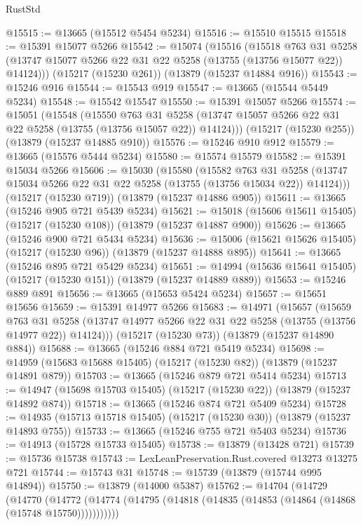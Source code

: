 \begin{lexlean}{RustStd}
\begin{coremodule}
@15515 := @13665 (@15512 @5454 @5234)
@15516 := @15510 @15515
@15518 := @15391 @15077 @5266
@15542 := @15074
    (@15516
      (@15518
        @763
        @31
        @5258
        (@13747 @15077 @5266 @22 @31 @22 @5258 (@13755 (@13756 @15077 @22)) @14124)))
    (@15217 (@15230 @261))
    (@13879 (@15237 @14884 @916))
@15543 := @15246 @916
@15544 := @15543 @919
@15547 := @13665 (@15544 @5449 @5234)
@15548 := @15542 @15547
@15550 := @15391 @15057 @5266
@15574 := @15051
    (@15548
      (@15550
        @763
        @31
        @5258
        (@13747 @15057 @5266 @22 @31 @22 @5258 (@13755 (@13756 @15057 @22)) @14124)))
    (@15217 (@15230 @255))
    (@13879 (@15237 @14885 @910))
@15576 := @15246 @910 @912
@15579 := @13665 (@15576 @5444 @5234)
@15580 := @15574 @15579
@15582 := @15391 @15034 @5266
@15606 := @15030
    (@15580
      (@15582
        @763
        @31
        @5258
        (@13747 @15034 @5266 @22 @31 @22 @5258 (@13755 (@13756 @15034 @22)) @14124)))
    (@15217 (@15230 @719))
    (@13879 (@15237 @14886 @905))
@15611 := @13665 (@15246 @905 @721 @5439 @5234)
@15621 := @15018 (@15606 @15611 @15405) (@15217 (@15230 @108)) (@13879 (@15237 @14887 @900))
@15626 := @13665 (@15246 @900 @721 @5434 @5234)
@15636 := @15006 (@15621 @15626 @15405) (@15217 (@15230 @96)) (@13879 (@15237 @14888 @895))
@15641 := @13665 (@15246 @895 @721 @5429 @5234)
@15651 := @14994 (@15636 @15641 @15405) (@15217 (@15230 @151)) (@13879 (@15237 @14889 @889))
@15653 := @15246 @889 @891
@15656 := @13665 (@15653 @5424 @5234)
@15657 := @15651 @15656
@15659 := @15391 @14977 @5266
@15683 := @14971
    (@15657
      (@15659
        @763
        @31
        @5258
        (@13747 @14977 @5266 @22 @31 @22 @5258 (@13755 (@13756 @14977 @22)) @14124)))
    (@15217 (@15230 @73))
    (@13879 (@15237 @14890 @884))
@15688 := @13665 (@15246 @884 @721 @5419 @5234)
@15698 := @14959 (@15683 @15688 @15405) (@15217 (@15230 @82)) (@13879 (@15237 @14891 @879))
@15703 := @13665 (@15246 @879 @721 @5414 @5234)
@15713 := @14947 (@15698 @15703 @15405) (@15217 (@15230 @22)) (@13879 (@15237 @14892 @874))
@15718 := @13665 (@15246 @874 @721 @5409 @5234)
@15728 := @14935 (@15713 @15718 @15405) (@15217 (@15230 @30)) (@13879 (@15237 @14893 @755))
@15733 := @13665 (@15246 @755 @721 @5403 @5234)
@15736 := @14913 (@15728 @15733 @15405)
@15738 := @13879 (@13428 @721)
@15739 := @15736 @15738
@15743 := LexLeanPreservation.Rust.covered @13273 @13275 @721
@15744 := @15743 @31
@15748 := @15739 (@13879 (@15744 @995 @14894))
@15750 := @13879 (@14000 @5387)
@15762 := @14704
    (@14729
      (@14770
        (@14772 (@14774 (@14795 (@14818 (@14835 (@14853 (@14864 (@14868 (@15748 @15750)))))))))))

\end{coremodule}
\end{lexlean}
